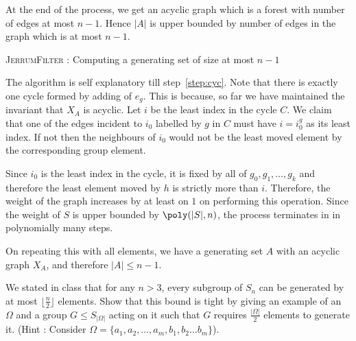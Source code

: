 At the end of the process, we get an acyclic graph which is a forest with
number of edges at most $n-1$. Hence $|A|$ is upper bounded by number of
edges in the graph which is at most $n-1$.

\begin{algorithm}[htp!]
\caption{\textsc{JerrumFilter} : Computing a generating set of size at most
$n-1$}
\label{alg:jerfilter}
\begin{algorithmic}[1] 
		 \label{step:cyc}
		\EndIf
	\EndFor
\EndProcedure
\end{algorithmic}
\end{algorithm}

The algorithm is self explanatory till step~\ref{step:cyc}. Note that there is
exactly one cycle formed by adding of $e_g$. This is because, so far we have
maintained the invariant that $X_A$ is acyclic.
Let $i$ be the least index in the cycle $C$. We claim that
one of the edges incident to $i_0$ labelled by $g$ in $C$ must have $i =
i_0^g$ as its least index.  If not then the
neighbours of $i_0$ would not be the least moved element by the corresponding
group element.

Since $i_0$ is the least index in the cycle, it is fixed by all of 
$g_0, g_1,\ldots, g_k$ and therefore the least element moved by $h$ is
strictly more than $i$. Therefore, the weight of the graph increases by at
least on $1$ on performing this operation. 
Since the weight of $S$ is upper bounded by $\poly(|S|,n)$, the process 
terminates in in polynomially many steps. 
	
On repeating this with all elements, we have a generating set $A$ with an
acyclic graph $X_{A}$, and therefore $|A|\leq n-1$.

\begin{exercise}

We stated in class that for any $n > 3$, every subgroup of $S_n$ can be generated by at most $\lfloor \frac{n}{2} \rfloor$ elements. Show that this bound is tight by giving an example of an $\Omega$ and a group $G \le S_{|\Omega|}$ acting on it such that $G$ requires $\frac{|\Omega|}{2}$ elements to generate it. (Hint : Consider $\Omega = \{a_1, a_2, \ldots, a_m, b_1, b_2 \ldots b_m \}$).
\end{exercise}


